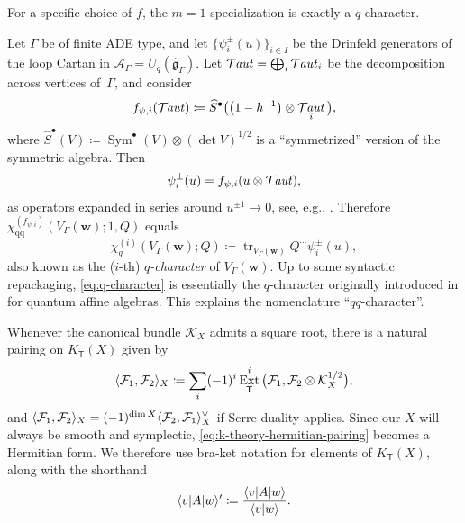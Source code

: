\documentclass[pdftex]{sigma}%
\numberwithin{equation}{section}
\renewcommand{\hat}[1]{\widehat{#1}}
\renewcommand{\vec}[1]{\bm{#1}}
\newcommand{\lie}[1]{\mathfrak{#1}}
\newcommand{\cF}{\mathcal{F}}
\newcommand{\cK}{\mathcal{K}}
\newcommand{\kQ}{Q}
\newcommand{\sT}{\mathsf{T}}
\newcommand{\scA}{\mathscr{A}}
\newcommand{\chiqq}{\chi_{\mathrm{qq}}}
\DeclareMathOperator{\Taut}{\mathcal{T}\mkern-1.5mu{\mathit{aut}}}
\DeclareMathOperator{\tr}{tr}
\DeclareMathOperator{\Sym}{Sym}
\DeclareMathOperator{\Ext}{Ext}
\DeclarePairedDelimiter{\inner}{\langle}{\rangle}
\begin{document}
\begin{MyParagraph}  For a specific choice of $f$, the $m=1$ specialization is exactly a $q$-character.
\begin{Example} \label{ex:q-character}
 Let $\Gamma$ be of finite ADE type, and let $\big\{\psi_i^\pm(u)\big\}_{i \in I}$
 be the Drinfeld generators of the loop Cartan in
 $\scA_\Gamma = U_q(\hat{\lie{g}}_\Gamma)$. Let $\Taut = \bigoplus_i \Taut_i$
 be the decomposition across vertices of~$\Gamma$, and consider
 \begin{equation} \label{eq:psi-geometric}
 f_{\psi,i}(\Taut) \coloneqq \hat S^\bullet\big(\big(1 - \hbar^{-1}\big) \otimes \Taut_i\big),
 \end{equation}
 where $\hat S^\bullet(V) \coloneqq \Sym^\bullet(V) \otimes (\det
 V)^{1/2}$ is a ``symmetrized'' version of the symmetric algebra.
 Then
 \begin{equation} \label{eq:psi-geometric-u}
 \psi_i^\pm(u) = f_{\psi,i}(u \otimes \Taut),
 \end{equation}
 as operators expanded in series around $u^{\pm 1} \to 0$, see, e.g.,
 \cite[Theorem~9.4.1]{Nakajima2001}. Therefore
 $\chiqq^{(f_{\psi,i})}(V_\Gamma(\vec w); 1, \kQ)$ equals
 \begin{equation} \label{eq:q-character}
 \chi_q^{(i)}(V_\Gamma(\vec w); \kQ) \coloneqq \tr_{V_\Gamma(\vec w)} Q^{\cdots} \psi_i^\pm(u),
 \end{equation}
 also known as the ($i$-th) {\it $q$-character} of $V_\Gamma(\vec w)$. Up
 to some syntactic repackaging, \eqref{eq:q-character} is essentially
 the $q$-character originally introduced in \cite{Frenkel1999} for
 quantum affine algebras. This explains the nomenclature
 ``$qq$-character''.
\end{Example}
\end{MyParagraph}

\begin{MyParagraph}
Whenever the canonical bundle $\cK_X$ admits a square root, there is a
natural pairing on $K_\sT(X)$ given by
\begin{equation} \label{eq:k-theory-hermitian-pairing}
 \inner{\cF_1, \cF_2}_X \coloneqq \sum_i (-1)^i \Ext^i_\sT\big(\cF_1, \cF_2 \otimes \cK_X^{1/2}\big),
\end{equation}
and
$\inner{\cF_1, \cF_2}_X = (-1)^{\dim X} \inner{\cF_2, \cF_1}_X^\vee$
if Serre duality applies. Since our $X$ will always be smooth and
symplectic, \eqref{eq:k-theory-hermitian-pairing} becomes a Hermitian
form. We therefore use bra-ket notation for elements of $K_\sT(X)$,
along with the shorthand
\[ \inner{v | A | w}' \coloneqq \frac{\inner{v | A | w}}{\inner{v | w}}. \]
\end{MyParagraph}
\end{document}
